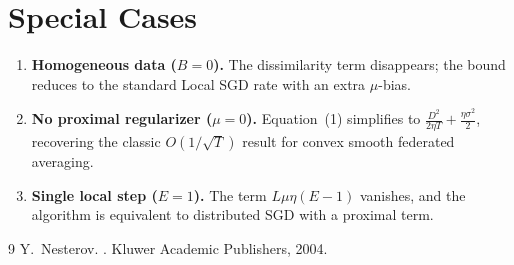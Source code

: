 \documentclass[11pt]{article}
\begin{document}
\section*{Special Cases}
\begin{enumerate}
\item \textbf{Homogeneous data ($B=0$).}
   The dissimilarity term disappears; the bound reduces to
   the standard Local SGD rate with an extra $\mu$-bias.
\item \textbf{No proximal regularizer ($\mu=0$).}
   Equation~(1) simplifies to
   $\frac{D^2}{2\eta T}+\frac{\eta\sigma^2}{2}$,
   recovering the classic $O(1/\sqrt{T})$ result for convex smooth
   federated averaging.
\item \textbf{Single local step ($E=1$).}
   The term $L\mu\eta(E-1)$ vanishes, and the algorithm is
   equivalent to distributed SGD with a proximal term.
\end{enumerate}


\begin{thebibliography}{9}
Y.~Nesterov.
.
\newblock Kluwer Academic Publishers, 2004.
\end{thebibliography}
\end{document}
